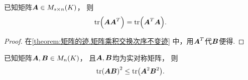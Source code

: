 \begin{property}
已知矩阵\(\boldsymbol{A} \in M_{s \times n}(K)\)，
则\begin{equation}
	\tr(\boldsymbol{A}\boldsymbol{A}^T) = \tr(\boldsymbol{A}^T\boldsymbol{A}).
\end{equation}
\begin{proof}
在\cref{theorem:矩阵的迹.矩阵乘积交换次序不变迹} 中，用\(\boldsymbol{A}^T\)代\(\boldsymbol{B}\)便得.
\end{proof}
\end{property}

\begin{property}
已知矩阵\(\boldsymbol{A},\boldsymbol{B} \in M_n(K)\)，
且\(\boldsymbol{A},\boldsymbol{B}\)均为实对称矩阵，
则\begin{equation}
	\tr(\boldsymbol{A} \boldsymbol{B})^2 \leq \tr(\boldsymbol{A}^2 \boldsymbol{B}^2).
\end{equation}
\end{property}

